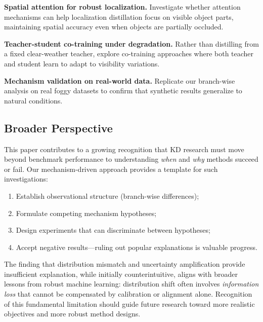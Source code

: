 \textbf{Spatial attention for robust localization.} Investigate whether attention mechanisms can help localization distillation focus on visible object parts, maintaining spatial accuracy even when objects are partially occluded.

\textbf{Teacher-student co-training under degradation.} Rather than distilling from a fixed clear-weather teacher, explore co-training approaches where both teacher and student learn to adapt to visibility variations.

\textbf{Mechanism validation on real-world data.} Replicate our branch-wise analysis on real foggy datasets to confirm that synthetic results generalize to natural conditions.

\subsection{Broader Perspective}

This paper contributes to a growing recognition that KD research must move beyond benchmark performance to understanding \emph{when} and \emph{why} methods succeed or fail. Our mechanism-driven approach provides a template for such investigations:
\begin{enumerate}
    \item Establish observational structure (branch-wise differences);
    \item Formulate competing mechanism hypotheses;
    \item Design experiments that can discriminate between hypotheses;
    \item Accept negative results---ruling out popular explanations is valuable progress.
\end{enumerate}

The finding that distribution mismatch and uncertainty amplification provide insufficient explanation, while initially counterintuitive, aligns with broader lessons from robust machine learning: distribution shift often involves \emph{information loss} that cannot be compensated by calibration or alignment alone. Recognition of this fundamental limitation should guide future research toward more realistic objectives and more robust method designs.
